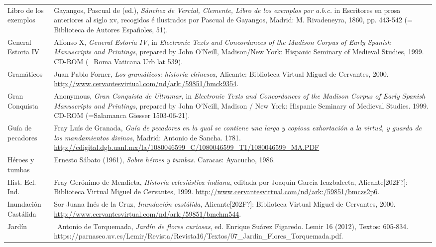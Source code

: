 \documentclass[10pt]{article}
\begin{document}
\begin{flushleft}
\begin{supertabular}{m{1.7955599in}m{4.42126in}}
\\
Libro de los exemplos &
Gayangos, Pascual de (ed.), \textit{Sánchez de Vercial, Clemente, Libro de los exemplos por a.b.c.} in Escritores en prosa anteriores al siglo xv, recogidos é ilustrados por Pascual de Gayangos, Madrid: M. Rivadeneyra, 1860, pp. 443-542 (= Biblioteca de Autores Españoles, 51).\\
General Estoria IV  &
Alfonso X, \textit{General Estoria IV}, in \textit{Electronic Texts and Concordances of the Madison Corpus of Early Spanish Manuscripts and Printings},\textit{ }prepared by John O’Neill, Madison/New York: Hispanic Seminary of Medieval Studies, 1999. CD-ROM (=Roma Vaticana Urb lat 539).\\
Gramáticos  &
Juan Pablo Forner, \textit{Los gramáticos: historia chinesca}, Alicante: Biblioteca Virtual Miguel de Cervantes, 2000. \url{http://www.cervantesvirtual.com/nd/ark:/59851/bmck9354}.\\
Gran Conquista  &
Anonymous,\textit{ Gran Conquista de Ultramar}, in \textit{Electronic Texts and Concordances of the Madison Corpus of Early Spanish Manuscripts and Printings}, prepared by John O’Neill, Madison / New York: Hispanic Seminary of Medieval Studies. 1999. CD-ROM (=Salamanca Giesser 1503-06-21).\\
Guía de pecadores  &
Fray Luís de Granada, \textit{Guía de pecadores en la qual se contiene una larga y copiosa exhortación a la virtud, y guarda de los mandamientos divinos}, Madrid: Antonio de Sancha. 1781. \url{http://cdigital.dgb.uanl.mx/la/1080046599_C/1080046599_T1/1080046599_MA.PDF}\\
Héroes y tumbas  &
Ernesto Sábato (1961), \textit{Sobre héroes y tumbas}. Caracas: Ayacucho, 1986.\\
Hist. Ecl. Ind.  &
Fray Gerónimo de Mendieta, \textit{Historia eclesiástica indiana}, editada por Joaquín García Icazbalceta, Alicante[202F?]: Biblioteca Virtual Miguel de Cervantes, 1999. \url{http://www.cervantesvirtual.com/nd/ark:/59851/bmczs2p6}.\\
Inundación Castálida  &
Sor Juana Inés de la Cruz, \textit{Inundación castálida},\textit{ }Alicante[202F?]: Biblioteca Virtual Miguel de Cervantes, 2000. \url{http://www.cervantesvirtual.com/nd/ark:/59851/bmchm544}.\\
Jardín  &
\ Antonio de Torquemada, \textit{Jardín de flores curiosas}, ed. Enrique Suárez Figaredo. Lemir 16 (2012), Textos: 605-834. https://parnaseo.uv.es/Lemir/Revista/Revista16/Textos/07\_Jardin\_Flores\_Torquemada.pdf.\\

\end{supertabular}
\end{flushleft}
\end{document}
